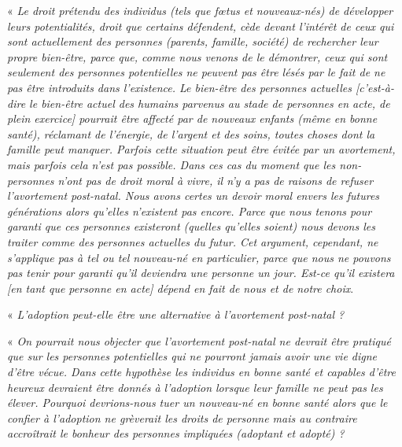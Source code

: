 « \emph{Le droit prétendu des individus (tels que fœtus et nouveaux-nés) de développer leurs potentialités, droit que certains défendent, cède devant l'intérêt de ceux qui sont actuellement des personnes (parents, famille, société) de rechercher leur propre bien-être, parce que, comme nous venons de le démontrer, ceux qui sont seulement des personnes potentielles ne peuvent pas être lésés par le fait de ne pas être introduits dans l'existence. Le bien-être des personnes actuelles \emph{[c'est-à-dire le bien-être actuel des humains parvenus au stade de personnes en acte, de plein exercice]} pourrait être affecté par de nouveaux enfants (même en bonne santé), réclamant de l'énergie, de l'argent et des soins, toutes choses dont la famille peut manquer. Parfois cette situation peut être évitée par un avortement, mais parfois cela n'est pas possible. Dans ces cas du moment que les non-personnes n'ont pas de droit moral à vivre, il n'y a pas de raisons de refuser l'avortement post-natal. Nous avons certes un devoir moral envers les futures générations alors qu'elles n'existent pas encore. Parce que nous tenons pour garanti que ces personnes existeront (quelles qu'elles soient) nous devons les traiter comme des personnes actuelles du futur. Cet argument, cependant, ne s'applique pas à tel ou tel nouveau-né en particulier, parce que nous ne pouvons pas tenir pour garanti qu'il deviendra une personne un jour. Est-ce qu'il existera \emph{[en tant que personne en acte]} dépend en fait de nous et de notre choix}.

« \emph{L'adoption peut-elle être une alternative à l'avortement post-natal ?}

« \emph{On pourrait nous objecter que l'avortement post-natal ne devrait être pratiqué que sur les personnes potentielles qui ne pourront jamais avoir une vie digne d'être vécue. Dans cette hypothèse les individus en bonne santé et capables d'être heureux devraient être donnés à l'adoption lorsque leur famille ne peut pas les élever. Pourquoi devrions-nous tuer un nouveau-né en bonne santé alors que le confier à l'adoption ne grèverait les droits de personne mais au contraire accroîtrait le bonheur des personnes impliquées (adoptant et adopté) ?}

